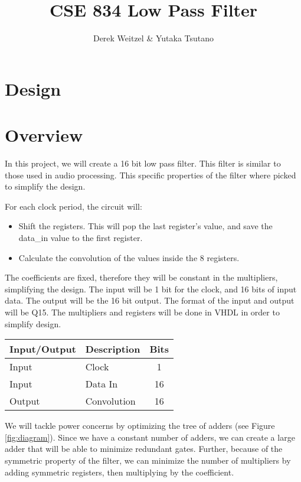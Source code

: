 \documentclass[12pt]{article}
\title{CSE 834 Low Pass Filter}
\author{Derek Weitzel \& Yutaka Tsutano}
\begin{document}
\maketitle



\section{Design}









\section{Overview}
In this project, we will create a 16 bit low pass filter.  This filter is similar to those used in audio processing.  This specific properties of the filter where picked to simplify the design.

For each clock period, the circuit will:
\begin{itemize}
\item Shift the registers.  This will pop the last register's value, and save the data\_in value to the first register.
\item Calculate the convolution of the values inside the 8 registers.
\end{itemize}

The coefficients are fixed, therefore they will be constant in the multipliers, simplifying the design.  The input will be 1 bit for the clock, and 16 bits of input data.  The output will be the 16 bit output.  The format of the input and output will be Q15.  The multipliers  and registers will be done in VHDL in order to simplify design.

\begin{table}[ht]
\centering
\begin{tabular}{l | l | c}
\hline
Input/Output & Description & Bits \\
\hline \hline
Input & Clock & 1 \\
Input & Data In & 16 \\
Output & Convolution & 16 \\
\end{tabular}
\end{table}

We will tackle power concerns by optimizing the tree of adders (see Figure \ref{fig:diagram}).  Since we have a constant number of adders, we can create a large adder that will be able to minimize redundant gates.  Further, because of the symmetric property of the filter, we can minimize the number of multipliers by adding symmetric registers, then multiplying by the coefficient.  
\end{document}

